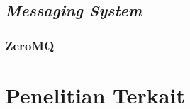 \subsection{\textit{Messaging System}}

\subsubsection{ZeroMQ}

\section{Penelitian Terkait}
\blindtext